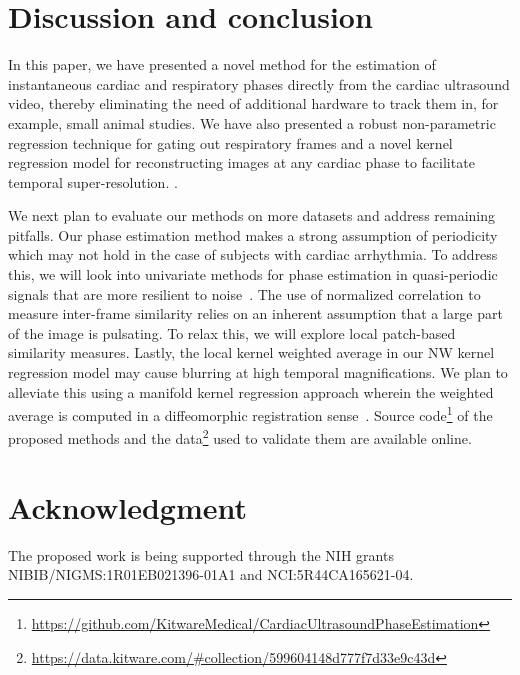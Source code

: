 \documentclass[journal]{IEEEtran}
\newcommand{\rk}[1]{{\color{blue}{#1}}}
\begin{document}
\section{Discussion and conclusion}
\label{sec:conclusion}
%
In this paper, we have presented a novel method for the estimation of instantaneous cardiac and respiratory phases directly from the cardiac ultrasound video, thereby eliminating the need of additional hardware to track them in, for example, small animal studies. We have also presented a robust non-parametric regression technique for gating out respiratory frames and a novel kernel regression model for reconstructing images at any cardiac phase to facilitate temporal super-resolution. \rk{Note that the proposed phase estimation method is designed to be applied retrospectively after the ultrasound video is acquired and, hence, cannot be used in applications where live estimation of phase is required}.

We next plan to evaluate our methods on more datasets and address remaining pitfalls. Our phase estimation method makes a strong assumption of periodicity which may not hold in the case of subjects with cardiac arrhythmia. To address this, we will look into univariate methods for phase estimation in quasi-periodic signals that are more resilient to noise~\cite{Luo2003,Lu2013,Kurz2015}. The use of normalized correlation to measure inter-frame similarity relies on an inherent assumption that a large part of the image is pulsating. To relax this, we will explore local patch-based similarity measures. Lastly, the local kernel weighted average in our NW kernel regression model may cause blurring at high temporal magnifications. We plan to alleviate this using a manifold kernel regression approach wherein the weighted average is computed in a diffeomorphic registration sense~\cite{Davis2010}. Source code\footnote{\url{https://github.com/KitwareMedical/CardiacUltrasoundPhaseEstimation}} of the proposed methods and the data\footnote{\url{https://data.kitware.com/\#collection/599604148d777f7d33e9c43d}} used to validate them are available online.
%
%
\section*{Acknowledgment}
The proposed work is being supported through the NIH grants NIBIB/NIGMS:1R01EB021396-01A1 and NCI:5R44CA165621-04. 
%


%
\end{document}
